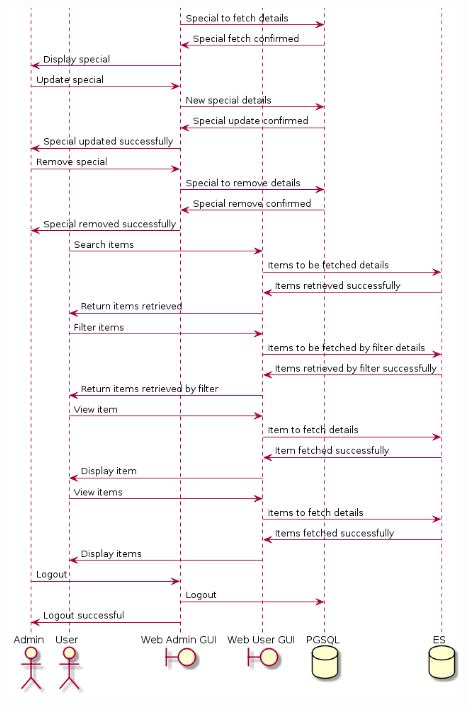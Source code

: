 \documentclass[a4paper,10pt]{article}
\begin{document}
\includegraphics[width=12cm]{System_Sequence_Diagram_2.png}
\end{document}
